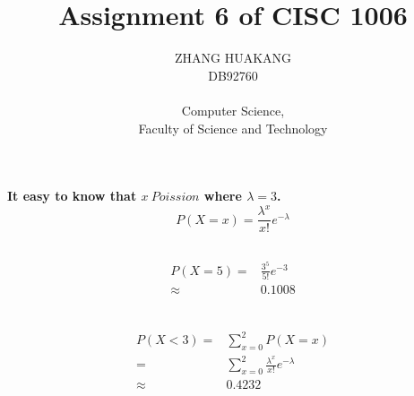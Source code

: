 \documentclass{article}
\title{Assignment 6 of CISC 1006}
\author{ZHANG HUAKANG \\ DB92760 \\ \\ Computer Science, \\Faculty of Science and Technology}
\begin{document}
    \maketitle
    \section{}
        \paragraph{
            It easy to know that $x~Poission$ where $\lambda=3$.
            $$P(X=x)=\frac{\lambda^x}{x!}e^{-\lambda}$$
        }
        \subsection{}
            \paragraph{
                \begin{equation*}
                    \begin{split}
                        P(X=5)=&\frac{3^5}{5!}e^{-3}\\
                            \approx&0.1008\\
                    \end{split}
                \end{equation*}
            }
        \subsection{}
            \paragraph{
                \begin{equation*}
                    \begin{split}
                        P(X<3)=&\sum_{x=0}^2 P(X=x)\\
                            =&\sum_{x=0}^2 \frac{\lambda^x}{x!}e^{-\lambda}\\
                            \approx&0.4232
                    \end{split}
                \end{equation*}
            }
        \subsection{}
\end{document}

